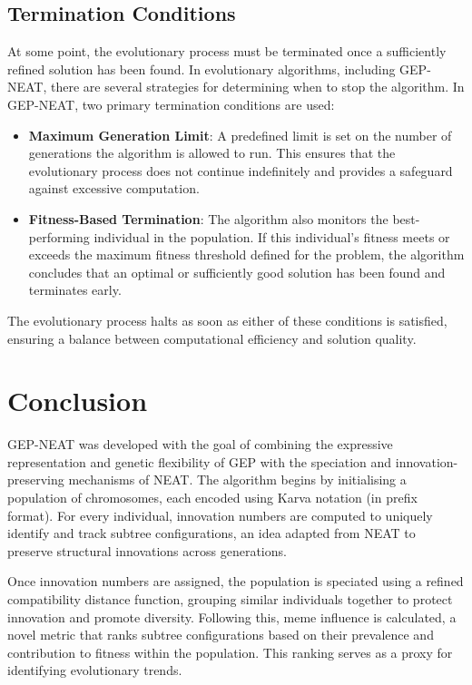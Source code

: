 \subsection{Termination Conditions}
At some point, the evolutionary process must be terminated once a sufficiently refined solution has been found. In evolutionary algorithms, including GEP-NEAT, there are several strategies for determining when to stop the algorithm. In GEP-NEAT, two primary termination conditions are used:
\begin{itemize}
	\item \textbf{Maximum Generation Limit}: A predefined limit is set on the number of generations the algorithm is allowed to run. This ensures that the evolutionary process does not continue indefinitely and provides a safeguard against excessive computation.
	\item \textbf{Fitness-Based Termination}: The algorithm also monitors the best-performing individual in the population. If this individual's fitness meets or exceeds the maximum fitness threshold defined for the problem, the algorithm concludes that an optimal or sufficiently good solution has been found and terminates early.
\end{itemize}

\parbreak\noindent The evolutionary process halts as soon as either of these conditions is satisfied, ensuring a balance between computational efficiency and solution quality.

\section{Conclusion}\label{sec:gep_neat_conclusion}
GEP-NEAT was developed with the goal of combining the expressive representation and genetic flexibility of GEP with the speciation and innovation-preserving mechanisms of NEAT. The algorithm begins by initialising a population of chromosomes, each encoded using Karva notation (in prefix format). For every individual, innovation numbers are computed to uniquely identify and track subtree configurations, an idea adapted from NEAT to preserve structural innovations across generations.

\parbreak\noindent Once innovation numbers are assigned, the population is speciated using a refined compatibility distance function, grouping similar individuals together to protect innovation and promote diversity. Following this, meme influence is calculated, a novel metric that ranks subtree configurations based on their prevalence and contribution to fitness within the population. This ranking serves as a proxy for identifying evolutionary trends.

